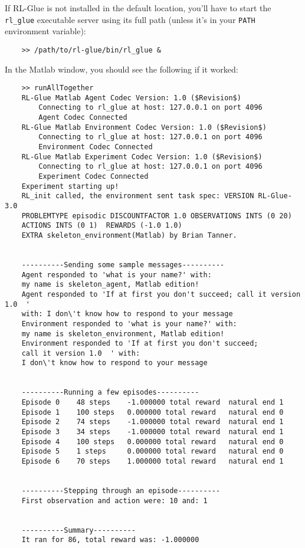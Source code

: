 \documentclass[11pt]{article}
\begin{document}
If RL-Glue is not installed in the default location, you'll have to start the \texttt{rl\_glue} executable server using its full path (unless it's in your \texttt{PATH} environment variable):
\begin{verbatim}
	>> /path/to/rl-glue/bin/rl_glue &
\end{verbatim}

In the Matlab window, you should see the following if it worked:
\begin{verbatim}
	>> runAllTogether
	RL-Glue Matlab Agent Codec Version: 1.0 ($Revision$)
		Connecting to rl_glue at host: 127.0.0.1 on port 4096
		Agent Codec Connected
	RL-Glue Matlab Environment Codec Version: 1.0 ($Revision$)
		Connecting to rl_glue at host: 127.0.0.1 on port 4096
		Environment Codec Connected
	RL-Glue Matlab Experiment Codec Version: 1.0 ($Revision$)
		Connecting to rl_glue at host: 127.0.0.1 on port 4096
		Experiment Codec Connected
	Experiment starting up!
	RL_init called, the environment sent task spec: VERSION RL-Glue-3.0 
	PROBLEMTYPE episodic DISCOUNTFACTOR 1.0 OBSERVATIONS INTS (0 20)  
	ACTIONS INTS (0 1)  REWARDS (-1.0 1.0)  
	EXTRA skeleton_environment(Matlab) by Brian Tanner.


	----------Sending some sample messages----------
	Agent responded to 'what is your name?' with: 
	my name is skeleton_agent, Matlab edition!
	Agent responded to 'If at first you don't succeed; call it version 1.0  ' 
	with: I don\'t know how to respond to your message
	Environment responded to 'what is your name?' with: 
	my name is skeleton_environment, Matlab edition!
	Environment responded to 'If at first you don't succeed; 
	call it version 1.0  ' with: 
	I don\'t know how to respond to your message


	----------Running a few episodes----------
	Episode 0	 48 steps 	 -1.000000 total reward	 natural end 1
	Episode 1	 100 steps 	 0.000000 total reward	 natural end 0
	Episode 2	 74 steps 	 -1.000000 total reward	 natural end 1
	Episode 3	 34 steps 	 -1.000000 total reward	 natural end 1
	Episode 4	 100 steps 	 0.000000 total reward	 natural end 0
	Episode 5	 1 steps 	 0.000000 total reward	 natural end 0
	Episode 6	 70 steps 	 1.000000 total reward	 natural end 1


	----------Stepping through an episode----------
	First observation and action were: 10 and: 1


	----------Summary----------
	It ran for 86, total reward was: -1.000000
\end{verbatim}
\end{document}
